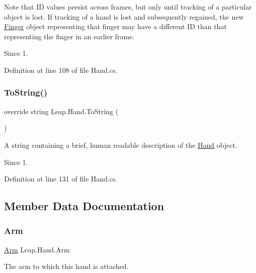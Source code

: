 Note that ID values persist across frames, but only until tracking of a particular object is lost. If tracking of a hand is lost and subsequently regained, the new \mbox{\hyperlink{class_leap_1_1_finger}{Finger}} object representing that finger may have a different ID than that representing the finger in an earlier frame.

\begin{DoxySince}{Since}
1. 
\end{DoxySince}


Definition at line 108 of file Hand.\+cs.

\mbox{\label{class_leap_1_1_hand_a10288a6a0fc042cd21cd21ff9a80b58f}} 
\subsubsection{\texorpdfstring{ToString()}{ToString()}}
{\footnotesize\ttfamily override string Leap.\+Hand.\+To\+String (\begin{DoxyParamCaption}{ }\end{DoxyParamCaption})}



A string containing a brief, human readable description of the \mbox{\hyperlink{class_leap_1_1_hand}{Hand}} object. 

\begin{DoxySince}{Since}
1. 
\end{DoxySince}


Definition at line 131 of file Hand.\+cs.



\subsection{Member Data Documentation}
\mbox{\label{class_leap_1_1_hand_a929a9aae640b9e8de5b544d7faacd04a}} 
\subsubsection{\texorpdfstring{Arm}{Arm}}
{\footnotesize\ttfamily \mbox{\hyperlink{class_leap_1_1_arm}{Arm}} Leap.\+Hand.\+Arm}



The arm to which this hand is attached. 

